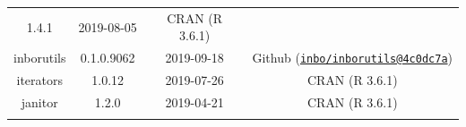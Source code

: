 \documentclass[11pt,]{book}
\begin{document}
\begin{longtable}[]{@{}cccc@{}}
\begin{minipage}[t]{0.19\columnwidth}
1.4.1\strut
\end{minipage} & \begin{minipage}[t]{0.16\columnwidth}\centering\strut
2019-08-05\strut
\end{minipage} & \begin{minipage}[t]{0.36\columnwidth}\centering\strut
CRAN (R 3.6.1)\strut
\end{minipage}\tabularnewline
\begin{minipage}[t]{0.18\columnwidth}\centering\strut
inborutils\strut
\end{minipage} & \begin{minipage}[t]{0.19\columnwidth}\centering\strut
0.1.0.9062\strut
\end{minipage} & \begin{minipage}[t]{0.16\columnwidth}\centering\strut
2019-09-18\strut
\end{minipage} & \begin{minipage}[t]{0.36\columnwidth}\centering\strut
Github
(\href{mailto:inbo/inborutils@4c0dc7a}{\nolinkurl{inbo/inborutils@4c0dc7a}})\strut
\end{minipage}\tabularnewline
\begin{minipage}[t]{0.18\columnwidth}\centering\strut
iterators\strut
\end{minipage} & \begin{minipage}[t]{0.19\columnwidth}\centering\strut
1.0.12\strut
\end{minipage} & \begin{minipage}[t]{0.16\columnwidth}\centering\strut
2019-07-26\strut
\end{minipage} & \begin{minipage}[t]{0.36\columnwidth}\centering\strut
CRAN (R 3.6.1)\strut
\end{minipage}\tabularnewline
\begin{minipage}[t]{0.18\columnwidth}\centering\strut
janitor\strut
\end{minipage} & \begin{minipage}[t]{0.19\columnwidth}\centering\strut
1.2.0\strut
\end{minipage} & \begin{minipage}[t]{0.16\columnwidth}\centering\strut
2019-04-21\strut
\end{minipage} & \begin{minipage}[t]{0.36\columnwidth}\centering\strut
CRAN (R 3.6.1)\strut
\end{minipage}\tabularnewline
\begin{minipage}[t]{0.18\columnwidth}\centering\strut

\end{minipage}
\end{longtable}
\end{document}
